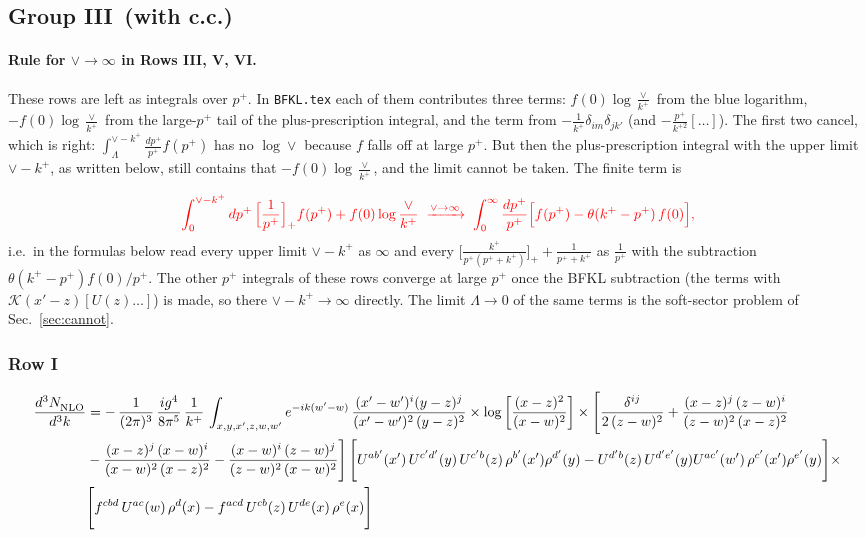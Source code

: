\documentclass[9pt]{article}
\numberwithin{equation}{section}
\newcommand{\chg}[1]{{\color{red}#1}}
\begin{document}
\subsection{Group III\, (with c.c.)}
\chg{\paragraph{Rule for $\vee\to\infty$ in Rows III, V, VI.} These rows are left as integrals over $p^{+}$. In \texttt{BFKL.tex} each of them contributes three terms: $f(0)\log\frac{\vee}{k^{+}}$ from the blue logarithm, $-f(0)\log\frac{\vee}{k^{+}}$ from the large-$p^{+}$ tail of the plus-prescription integral, and the term from $-\frac{1}{k^{+}}\delta_{im}\delta_{jk'}$ (and $-\frac{p^{+}}{k^{+2}}[\ldots]$). The first two cancel, which is right: $\int_{\Lambda}^{\vee-k^{+}}\frac{dp^{+}}{p^{+}}f(p^{+})$ has no $\log\vee$ because $f$ falls off at large $p^{+}$. But then the plus-prescription integral with the upper limit $\vee-k^{+}$, as written below, still contains that $-f(0)\log\frac{\vee}{k^{+}}$, and the limit cannot be taken. The finite term is}
\begin{align}
\chg{\int_{0}^{\vee-k^{+}}dp^{+}\,\Big[\frac{1}{p^{+}}\Big]_{+}f(p^{+})+f(0)\log\frac{\vee}{k^{+}}\;\xrightarrow{\vee\to\infty}\;\int_{0}^{\infty}\frac{dp^{+}}{p^{+}}\Big[f(p^{+})-\theta(k^{+}-p^{+})\,f(0)\Big],}
\end{align}
\chg{i.e.\ in the formulas below read every upper limit $\vee-k^{+}$ as $\infty$ and every $\big[\frac{k^{+}}{p^{+}(p^{+}+k^{+})}\big]_{+}+\frac{1}{p^{+}+k^{+}}$ as $\frac{1}{p^{+}}$ with the subtraction $\theta(k^{+}-p^{+})f(0)/p^{+}$. The other $p^{+}$ integrals of these rows converge at large $p^{+}$ once the BFKL subtraction (the terms with $\mathcal{K}(x'-z)[U(z)\ldots]$) is made, so there $\vee-k^{+}\to\infty$ directly. The limit $\Lambda\to0$ of the same terms is the soft-sector problem of Sec.~\ref{sec:cannot}.}

\subsubsection{Row I}
\begin{align}
     \frac{d^{3}N_{\rm NLO}^{\rm}}{d^{3}k}  & =   -\,\frac{1}{(2\pi)^{3}}\, \frac{ig^{4}}{8\pi^{5}}\,\frac{1}{k^{+}}\,\int_{x,y,x',z,w,w^{\prime}} e^{-ik(w^{\prime}-w)}\,\frac{(x'-w')^{i}(y-z)^{j}}{(x'-w')^{2}\,(y-z)^{2}}\times \log{\left[\frac{(x-z)^{2}}{(x-w)^{2}}\right]}\times \Bigg[\frac{\delta^{ij}}{2\,(z-w)^{2}}+\frac{(x-z)^{j}\,(z-w)^{i}}{(z-w)^{2}\,(x-z)^{2}}\notag \\ & -\frac{(x-z)^{j}\,(x-w)^{i}}{(x-w)^{2}\,(x-z)^{2}}-\frac{(x-w)^{i}\,(z-w)^{j}}{(z-w)^{2}\,(x-w)^{2}}\Bigg]\, \Bigg[U^{ab'}(x')\,U^{c'd'}(y)\,U^{c'b}(z)\,\rho^{b'}(x')\rho^{d'}(y)-U^{d'b}(z)\,U^{d'e'}(y)U^{ac'}(w')\,\rho^{c'}(x')\rho^{e'}(y)\Bigg]\times\notag \\ & \Bigg[f^{cbd}\,U^{ac}(w)\,\rho^{d}(x)-f^{acd}\, U^{cb}(z)\,U^{de}(x)\,\rho^{e}(x)\Bigg]
\end{align}
\end{document}
